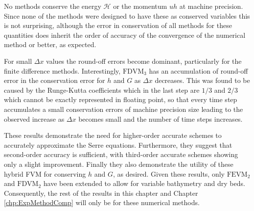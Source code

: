 No methods conserve the energy $\mathcal{H}$ or the momentum $uh$ at machine precision. Since none of the methods were designed to have these as conserved variables this is not surprising, although the error in conservation of all methods for these quantities does inherit the order of accuracy of the convergence of the numerical method or better, as expected. 

For small $\Delta x$ values the round-off errors become dominant, particularly for the finite difference methods. Interestingly, $\text{FDVM}_3$ has an accumulation of round-off error in the conservation error for $h$ and $G$ as $\Delta x$ decreases. This was found to be caused by the Runge-Kutta coefficients \cite{Zoppou-etal-2017} which in the last step are $1/3$ and $2/3$ which cannot be exactly represented in floating point, so that every time step accumulates a small conservation errors of machine precision size leading to the observed increase as $\Delta x$ becomes small and the number of time steps increases.

These results demonstrate the need for higher-order accurate schemes to accurately approximate the Serre equations. Furthermore, they suggest that second-order accuracy is sufficient, with third-order accurate schemes showing only a slight improvement. Finally they also demonstrate the utility of these hybrid FVM for conserving $h$ and $G$, as desired. Given these results, only $\text{FEVM}_2$ and $\text{FDVM}_2$ have been extended to allow for variable bathymetry and dry beds. Consequently, the rest of the results in this chapter and Chapter \ref{chp:ExpMethodComp} will only be for these numerical methods. 

